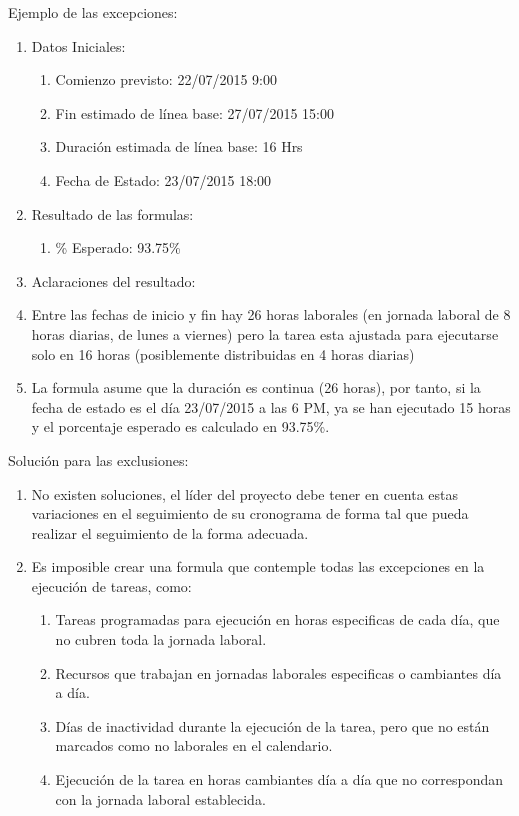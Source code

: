 \documentclass[11pt]{article} %
\begin{document}
Ejemplo de las excepciones:
\begin{enumerate}
\item Datos Iniciales: 
\begin{enumerate}
\item Comienzo previsto: 22/07/2015 9:00
\item Fin estimado de línea base: 27/07/2015 15:00
\item Duración estimada de línea base: 16 Hrs
\item Fecha de Estado: 23/07/2015 18:00
\end{enumerate}
\item Resultado de las formulas: 
\begin{enumerate}
\item \% Esperado: 93.75\%
\end{enumerate}
\item Aclaraciones del resultado: 
\item Entre las fechas de inicio y fin hay 26 horas laborales (en jornada laboral de 8 horas diarias, de lunes a viernes) pero la tarea esta ajustada para ejecutarse solo en 16 horas (posiblemente distribuidas en 4 horas diarias)
\item La formula asume que la duración es continua (26 horas), por tanto, si la fecha de estado es el día 23/07/2015 a las 6 PM, ya se han ejecutado 15 horas y el porcentaje esperado es calculado en 93.75\%.
\end{enumerate}
Solución para las exclusiones:
\begin{enumerate}
\item No existen soluciones, el líder del proyecto debe tener en cuenta estas variaciones en el seguimiento de su cronograma de forma tal que pueda realizar el seguimiento de la forma adecuada.
\item Es imposible crear una formula que contemple todas las excepciones en la ejecución de tareas, como: 
\begin{enumerate}
\item Tareas programadas para ejecución en horas especificas de cada día, que no cubren toda la jornada laboral.
\item Recursos que trabajan en jornadas laborales especificas o cambiantes día a día.
\item Días de inactividad durante la ejecución de la tarea, pero que no están marcados como no laborales en el calendario.
\item Ejecución de la tarea en horas cambiantes día a día que no correspondan con la jornada laboral establecida.
\end{enumerate}
\end{enumerate}
\end{document}
